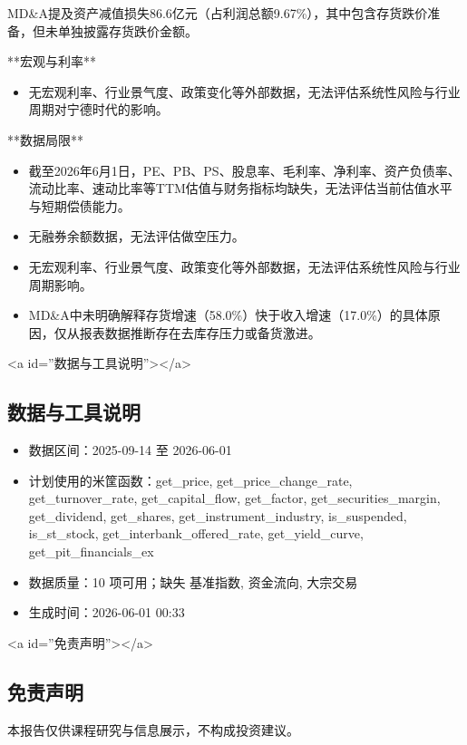 \documentclass[12pt,a4paper]{article}
\begin{document}
MD\&A提及资产减值损失86.6亿元（占利润总额9.67\%），其中包含存货跌价准备，但未单独披露存货跌价金额。

**宏观与利率**
\begin{itemize}
\item 无宏观利率、行业景气度、政策变化等外部数据，无法评估系统性风险与行业周期对宁德时代的影响。
\end{itemize}

**数据局限**
\begin{itemize}
\item 截至2026年6月1日，PE、PB、PS、股息率、毛利率、净利率、资产负债率、流动比率、速动比率等TTM估值与财务指标均缺失，无法评估当前估值水平与短期偿债能力。
\item 无融券余额数据，无法评估做空压力。
\item 无宏观利率、行业景气度、政策变化等外部数据，无法评估系统性风险与行业周期影响。
\item MD\&A中未明确解释存货增速（58.0\%）快于收入增速（17.0\%）的具体原因，仅从报表数据推断存在去库存压力或备货激进。
\end{itemize}

<a id=''数据与工具说明''></a>

\subsection{ 数据与工具说明}
\begin{itemize}
\item 数据区间：2025-09-14 至 2026-06-01
\item 计划使用的米筐函数：get\_price, get\_price\_change\_rate, get\_turnover\_rate, get\_capital\_flow, get\_factor, get\_securities\_margin, get\_dividend, get\_shares, get\_instrument\_industry, is\_suspended, is\_st\_stock, get\_interbank\_offered\_rate, get\_yield\_curve, get\_pit\_financials\_ex
\item 数据质量：10 项可用；缺失 基准指数, 资金流向, 大宗交易
\item 生成时间：2026-06-01 00:33
\end{itemize}

<a id=''免责声明''></a>

\subsection{ 免责声明}
本报告仅供课程研究与信息展示，不构成投资建议。
\end{document}
